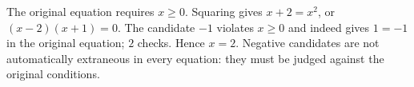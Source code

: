 The original equation requires $x\ge0$. Squaring gives $x+2=x^2$, or $(x-2)(x+1)=0$. The candidate $-1$ violates $x\ge0$ and indeed gives $1=-1$ in the original equation; $2$ checks. Hence $\boxed{x=2}$. Negative candidates are not automatically extraneous in every equation: they must be judged against the original conditions.
